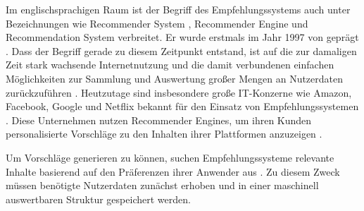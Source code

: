 Im englischsprachigen Raum ist der Begriff des Empfehlungssystems auch unter Bezeichnungen wie Recommender System \cite[S. 1]{lu:2015}, Recommender Engine \cite[S. 1]{panigrahi:2016} und Recommendation System \cite[S. 1]{ebesu:2018} verbreitet. Er wurde erstmals im Jahr 1997 von \textcite[S. 1]{resnick:1997} geprägt \cite[S. 1]{malinowski:2006}. Dass der Begriff gerade zu diesem Zeitpunkt entstand, ist auf die zur damaligen Zeit stark wachsende Internetnutzung und die damit verbundenen einfachen Möglichkeiten zur Sammlung und Auswertung großer Mengen an Nutzerdaten zurückzuführen \cite[S. xvii]{recommenderSystems:2016}. Heutzutage sind insbesondere große IT-Konzerne wie Amazon, Facebook, Google und Netflix bekannt für den Einsatz von Empfehlungssystemen \cite[S. 1]{zarzour:2018}. Diese Unternehmen nutzen Recommender Engines, um ihren Kunden personalisierte Vorschläge zu den Inhalten ihrer Plattformen anzuzeigen \cite[S. 2]{jeckmans:2013}.

Um Vorschläge generieren zu können, suchen Empfehlungssysteme relevante Inhalte basierend auf den Präferenzen ihrer Anwender aus \cite[S. 1]{das:2017}. Zu diesem Zweck müssen benötigte Nutzerdaten zunächst erhoben und in einer maschinell auswertbaren Struktur gespeichert werden.

